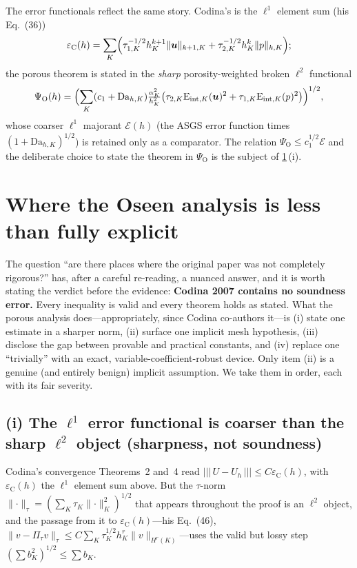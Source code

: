 \documentclass[11pt]{article}
\theoremstyle{remark}
\newcommand{\bu}{\boldsymbol{u}}
\newcommand{\norm}[1]{\lVert #1 \rVert}
\newcommand{\tnorm}[1]{\lvert\!\lvert\!\lvert\, #1 \,\rvert\!\rvert\!\rvert}
\newcommand{\Eint}[2]{\mathrm{E}_{\mathrm{int},#1}(#2)}
\newcommand{\Dah}{\mathrm{Da}_{h,K}}
\begin{document}
The error functionals reflect the same story. Codina's is the $\ell^1$ element sum
(his Eq.~(36))
\[
  \varepsilon_{\mathrm C}(h)=\sum_K\Bigl(\tau_{1,K}^{-1/2}h_K^{k+1}\norm{\bu}_{k+1,K}
  +\tau_{2,K}^{-1/2}h_K^{k}\norm{p}_{k,K}\Bigr);
\]
the porous theorem is stated in the \emph{sharp} porosity-weighted broken $\ell^2$ functional
\[
  \Psi_{\mathrm O}(h)=\Bigl(\sum_K(c_1+\Dah)\tfrac{\alpha_K^2}{h_K^2}
  \bigl(\tau_{2,K}\Eint{K}{\bu}^2+\tau_{1,K}\Eint{K}{p}^2\bigr)\Bigr)^{1/2},
\]
whose coarser $\ell^1$ majorant $\mathcal E(h)$ (the ASGS error function times
$(1+\Dah)^{1/2}$) is retained only as a comparator. The relation $\Psi_{\mathrm O}\le
c_1^{1/2}\mathcal E$ and the deliberate choice to state the theorem in $\Psi_{\mathrm O}$ is
the subject of \cref{sec:rigor}\,(i).

\section{Where the Oseen analysis is less than fully explicit}
\label{sec:rigor}

The question ``are there places where the original paper was not completely rigorous?'' has,
after a careful re-reading, a nuanced answer, and it is worth stating the verdict before the
evidence: \textbf{Codina 2007 contains no soundness error.} Every inequality is valid and
every theorem holds as stated. What the porous analysis does---appropriately, since Codina
co-authors it---is (i) state one estimate in a sharper norm, (ii) surface one implicit mesh
hypothesis, (iii) disclose the gap between provable and practical constants, and (iv) replace
one ``trivially'' with an exact, variable-coefficient-robust device. Only item (ii) is a
genuine (and entirely benign) implicit assumption. We take them in order, each with its fair
severity.

\subsection*{(i) The \texorpdfstring{$\ell^1$}{l1} error functional is coarser than the sharp \texorpdfstring{$\ell^2$}{l2} object (sharpness, not soundness)}

Codina's convergence Theorems~2 and~4 read $\tnorm{U-U_h}\le C\varepsilon_{\mathrm C}(h)$,
with $\varepsilon_{\mathrm C}(h)$ the \emph{$\ell^1$} element sum above. But the $\tau$-norm
$\norm{\cdot}_{\tau}=(\sum_K\tau_K\norm{\cdot}_K^2)^{1/2}$ that appears throughout the proof
is an \emph{$\ell^2$} object, and the passage from it to $\varepsilon_{\mathrm C}(h)$---his
Eq.~(46), $\norm{v-\Pi_\tau v}_\tau\le C\sum_K\tau_K^{1/2}h_K^r\norm{v}_{H^r(K)}$---uses the
valid but lossy step $(\sum b_K^2)^{1/2}\le\sum b_K$.
\end{document}
